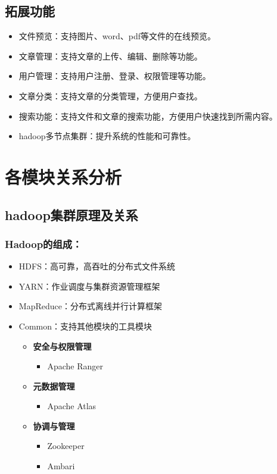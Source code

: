 \documentclass[bachelor]{thesis-uestc}
\begin{document}
\subsection{拓展功能}
\begin{itemize}
    \item 文件预览：支持图片、word、pdf等文件的在线预览。
    \item 文章管理：支持文章的上传、编辑、删除等功能。
    \item 用户管理：支持用户注册、登录、权限管理等功能。
    \item 文章分类：支持文章的分类管理，方便用户查找。
    \item 搜索功能：支持文件和文章的搜索功能，方便用户快速找到所需内容。
    \item hadoop多节点集群：提升系统的性能和可靠性。
\end{itemize}
\section{各模块关系分析}

\subsection{hadoop集群原理及关系}
\subsubsection{Hadoop的组成：\cite{hadoopguide}}
\begin{itemize}
\item HDFS：高可靠，高吞吐的分布式文件系统
\item YARN：作业调度与集群资源管理框架
\item MapReduce：分布式离线并行计算框架
\item Common：支持其他模块的工具模块\cite{hadoop_1}
\begin{itemize}[leftmargin=*,noitemsep]
    \item \textbf{安全与权限管理}
        \begin{itemize}
            \item Apache Ranger
        \end{itemize}
    
    \item \textbf{元数据管理}
        \begin{itemize}
            \item Apache Atlas
        \end{itemize}
    
    \item \textbf{协调与管理}
        \begin{itemize}
            \item Zookeeper
            \item Ambari
        \end{itemize}
\end{itemize}
\end{itemize}
\end{document}
